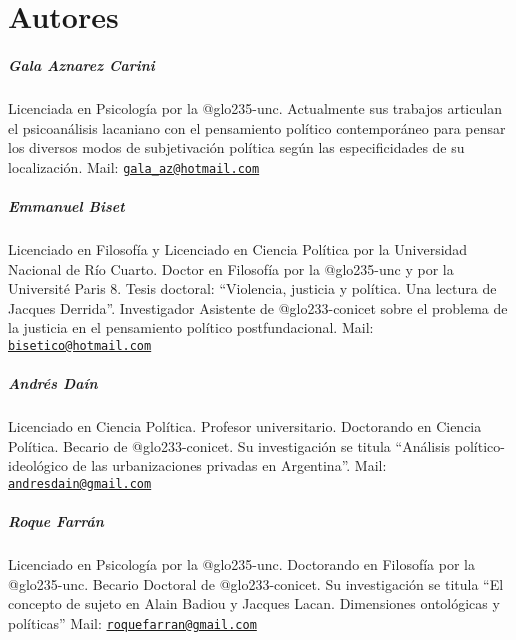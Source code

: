 \chapter{Autores}
\Author{ } %
\chaptermark{ }
\sectionmark{ } %

\paragraph{Gala Aznarez Carini}

Licenciada en Psicología por la \gls{@glo235-unc}. Actualmente sus trabajos articulan el psicoanálisis lacaniano con el pensamiento político contemporáneo para pensar los diversos modos de subjetivación política según las especificidades de su localización. Mail: \href{mailto:gala_az@hotmail.com}{\nolinkurl{gala\_az@hotmail.com}}

\paragraph{Emmanuel Biset}

Licenciado en Filosofía y Licenciado en Ciencia Política por la Universidad Nacional de Río Cuarto. Doctor en Filosofía por la \gls{@glo235-unc} y por la Université Paris 8. Tesis doctoral: \enquote{Violencia, justicia y política. Una lectura de Jacques Derrida}. Investigador Asistente de \gls{@glo233-conicet} sobre el problema de la justicia en el pensamiento político postfundacional. Mail: \href{mailto:bisetico@hotmail.com}{\nolinkurl{bisetico@hotmail.com}}

\paragraph{Andrés Daín}

Licenciado en Ciencia Política. Profesor universitario. Doctorando en Ciencia Política. Becario de \gls{@glo233-conicet}. Su investigación se titula \enquote{Análisis político-ideológico de las urbanizaciones privadas en Argentina}. Mail: \href{mailto:andresdain@gmail.com}{\nolinkurl{andresdain@gmail.com}}

\paragraph{Roque Farrán}

Licenciado en Psicología por la \gls{@glo235-unc}. Doctorando en Filosofía por la \gls{@glo235-unc}. Becario Doctoral de \gls{@glo233-conicet}. Su investigación se titula \enquote{El concepto de sujeto en Alain Badiou y Jacques Lacan. Dimensiones ontológicas y políticas} Mail: \href{mailto:roquefarran@gmail.com}{\nolinkurl{roquefarran@gmail.com}}

